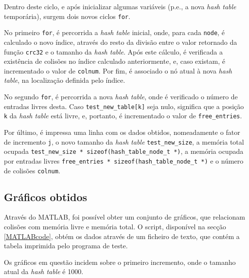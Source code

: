 \documentclass[portuguese,11pt,a4paper,titlepage]{article}
\newcommand{\srcdir}{..}
\newcommand{\hashtablegrowdir}{\srcdir/hash\_table\_grow-test}
\begin{document}


Dentro deste ciclo, e após inicializar algumas variáveis (p.e., a nova \textit{hash table} temporária), surgem dois novos ciclos \lstinline|for|.

No primeiro \lstinline|for|, é percorrida a \textit{hash table} inicial, onde, para cada \lstinline|node|, é calculado o novo índice, através do resto da divisão entre o valor retornado da função \lstinline|crc32| e o tamanho da \textit{hash table}. Após este cálculo, é verificada a existência de colisões no índice calculado anteriormente, e, caso existam, é incrementado o valor de \lstinline|colnum|. Por fim, é associado o nó atual à nova \textit{hash table}, na localização definida pelo índice.



No segundo \lstinline|for|, é percorrida a nova \textit{hash table}, onde é verificado o número de entradas livres desta. Caso \lstinline|test_new_table[k]| seja nulo, significa que a posição \lstinline|k| da \textit{hash table} está livre, e, portanto, é incrementado o valor de \lstinline|free_entries|.



Por último, é impressa uma linha com os dados obtidos, nomeadamente o fator de incremento \lstinline|j|, o novo tamanho da \textit{hash table} \lstinline|test_new_size|, a memória total ocupada \lstinline|test_new_size * sizeof(hash_table_node_t *)|, a memória ocupada por entradas livres \lstinline|free_entries * sizeof(hash_table_node_t *)| e o número de colisões \lstinline|colnum|.



\subsection{Gráficos obtidos}
Através do MATLAB, foi possível obter um conjunto de gráficos, que relacionam colisões com memória livre e memória total. O script, disponível na secção \ref{MATLABcode}, obtém os dados através de um ficheiro de texto, que contém a tabela imprimida pelo programa de teste.

Os gráficos em questão incidem sobre o primeiro incremento, onde o tamanho atual da \textit{hash table} é 1000.
\end{document}
